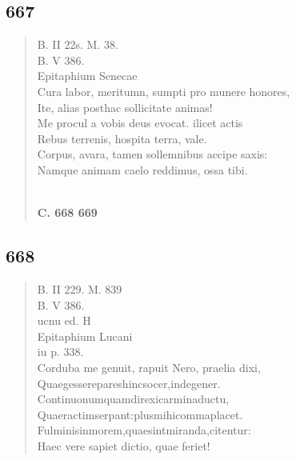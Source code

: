 \documentclass[11pt, a4paper]{report}
\begin{document}
            \subsection*{667}
      \begin{verse}
      B. II 22s. M. 38. \\ B. V 386. \\ Epitaphium Senecae \\ Cura labor, meritumn, sumpti pro munere honores, \\ Ite, alias posthac sollicitate animas! \\ Me procul a vobis deus evocat. ilicet actis \\ Rebus terrenis, hospita terra, vale. \\ Corpus, avara, tamen sollemnibus accipe saxis: \\ Namque animam caelo reddimus, ossa tibi. \\ 
        ﻿\pagebreak 
    \begin{center} \textbf{C. 668 669} \end{center} \marginpar{[139]} 
      \end{verse}
  
            \subsection*{668}
      \begin{verse}
      B. II 229. M. 839 \\ B. V 386. \\ ucnu ed. H \\ Epitaphium Lucani \\ iu p. 338. \\ Corduba me genuit, rapuit Nero, praelia dixi, \\ Quaegesserepareshincsocer,indegener. \\ Continuonumquamdirexicarminaductu, \\ Quaeractimserpant:plusmihicommaplacet. \\ Fulminisinmorem,quaesintmiranda,citentur: \\ Haec vere sapiet dictio, quae feriet! \\ 
      \end{verse}
  
\end{document}
